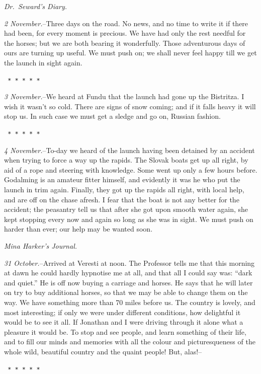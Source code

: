 \documentclass[12pt,openright]{book}
\begin{document}
\textit{Dr. Seward’s Diary.}

\textit{2 November.}–Three days on the road. No news, and no time to write it if there had been, for every moment is precious. We have had only the rest needful for the horses; but we are both bearing it wonderfully. Those adventurous days of ours are turning up useful. We must push on; we shall never feel happy till we get the launch in sight again.

\texttt{   *       *       *       *       *}

\textit{3 November.}–We heard at Fundu that the launch had gone up the Bistritza. I wish it wasn’t so cold. There are signs of snow coming; and if it falls heavy it will stop us. In such case we must get a sledge and go on, Russian fashion.

\texttt{   *       *       *       *       *}

\textit{4 November.}–To-day we heard of the launch having been detained by an accident when trying to force a way up the rapids. The Slovak boats get up all right, by aid of a rope and steering with knowledge. Some went up only a few hours before. Godalming is an amateur fitter himself, and evidently it was he who put the launch in trim again. Finally, they got up the rapids all right, with local help, and are off on the chase afresh. I fear that the boat is not any better for the accident; the peasantry tell us that after she got upon smooth water again, she kept stopping every now and again so long as she was in sight. We must push on harder than ever; our help may be wanted soon.

\textit{Mina Harker’s Journal.}

\textit{31 October.}–Arrived at Veresti at noon. The Professor tells me that this morning at dawn he could hardly hypnotise me at all, and that all I could say was: “dark and quiet.” He is off now buying a carriage and horses. He says that he will later on try to buy additional horses, so that we may be able to change them on the way. We have something more than 70 miles before us. The country is lovely, and most interesting; if only we were under different conditions, how delightful it would be to see it all. If Jonathan and I were driving through it alone what a pleasure it would be. To stop and see people, and learn something of their life, and to fill our minds and memories with all the colour and picturesqueness of the whole wild, beautiful country and the quaint people! But, alas!–

\texttt{   *       *       *       *       *}
\end{document}
